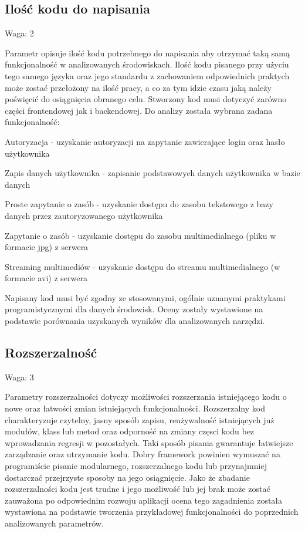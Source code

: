 \documentclass[12pt]{report}
\begin{document}
    \subsection{Ilość kodu do napisania}
      \begin{description}
        \item Waga: 2
      \end{description}
      Parametr opisuje ilość kodu potrzebnego do napisania aby otrzymać taką samą funkcjonalność w analizowanych środowiskach.
      Ilość kodu pisanego przy użyciu tego samego języka oraz jego standardu z zachowaniem odpowiednich praktych może zostać przełożony na ilość pracy, a co za tym idzie czasu jaką należy poświęcić do osiągnięcia obranego celu.
      Stworzony kod musi dotyczyć zarówno części frontendowej jak i backendowej.
      Do analizy została wybrana zadana funkcjonalność:
      \begin{description}
        \item Autoryzacja - uzyskanie autoryzacji na zapytanie zawierające login oraz hasło użytkownika
        \item Zapis danych użytkownika - zapisanie podstawowych danych użytkownika w bazie danych
        \item Proste zapytanie o zasób - uzyskanie dostępu do zasobu tekstowego z bazy danych przez zautoryzowanego użytkownika
        \item Zapytanie o zasób - uzyskanie dostępu do zasobu multimedialnego (pliku w formacie jpg) z serwera
        \item Streaming multimediów - uzyskanie dostępu do streamu multimedialnego (w formacie avi) z serwera
      \end{description}
      Napisany kod musi być zgodny ze stosowanymi, ogólnie uznanymi praktykami programistycznymi dla danych środowisk.
      Oceny zostały wystawione na podstawie porównania uzyskanych wyników dla analizowanych narzędzi.

    \subsection{Rozszerzalność}
      \begin{description}
        \item Waga: 3
      \end{description}
      Parametry rozszerzalności dotyczy możliwości rozszerzania istniejącego kodu o nowe oraz łatwości zmian istniejących funkcjonalności.
      Rozszerzalny kod charakteryzuje czytelny, jasny sposób zapisu, reużywalność istniejących już modułów, klass lub metod oraz odporność na zmiany częsci kodu bez wprowadzania regresji w pozostałych.
      Taki sposób pisania gwarantuje łatwiejsze zarządzanie oraz utrzymanie kodu.
      Dobry framework powinien wymuszać na programiście pisanie modularnego, rozszerzalnego kodu lub przynajmniej dostarczać przejrzyste sposoby na jego osiągnięcie.
      Jako że zbadanie rozszerzalności kodu jest trudne i jego możliwość lub jej brak może zostać zauważona po odpowiednim rozwoju aplikacji ocena tego zagadnienia została wystawiona na podstawie tworzenia przykładowej funkcjonalności do poprzednich analizowanych parametrów.
\end{document}
